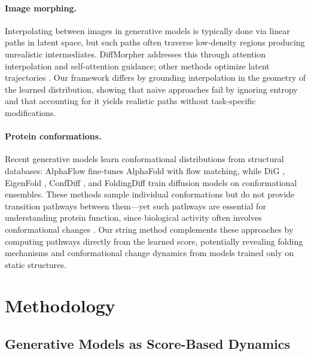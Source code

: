 \documentclass{article}
\theoremstyle{plain}
\theoremstyle{definition}
\theoremstyle{remark}
\begin{document}
\paragraph{Image morphing.} Interpolating between images in generative models is typically done via linear paths in latent space, but such paths often traverse low-density regions producing unrealistic intermediates. DiffMorpher \citep{zhang2024diffmorpher} addresses this through attention interpolation and self-attention guidance; other methods optimize latent trajectories \citep{wang2023interpolating}. Our framework differs by grounding interpolation in the geometry of the learned distribution, showing that naive approaches fail by ignoring entropy and that accounting for it yields realistic paths without task-specific modifications.

\paragraph{Protein conformations.} Recent generative models learn conformational distributions from structural databases: AlphaFlow \citep{jing2024alphaflow} fine-tunes AlphaFold with flow matching, while DiG \citep{zheng2023digmultimod}, EigenFold \citep{jing2023eigenfold}, ConfDiff \citep{wang2024confdiff}, and FoldingDiff \citep{wu2024foldingdiff} train diffusion models on conformational ensembles. These methods sample individual conformations but do not provide transition pathways between them---yet such pathways are essential for understanding protein function, since biological activity often involves conformational changes \citep{frauenfelder1991energy, henzler2007dynamic}. Our string method complements these approaches by computing pathways directly from the learned score, potentially revealing folding mechanisms and conformational change dynamics from models trained only on static structures.

\section{Methodology}
\label{sec:method}

\subsection{Generative Models as Score-Based Dynamics}
\label{sec:gen_mod}
\end{document}
